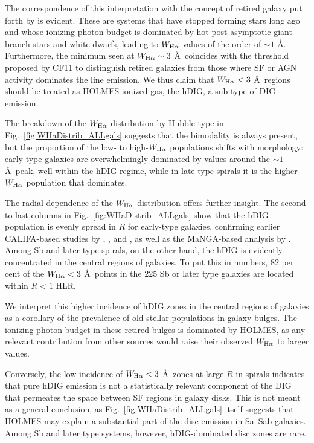 \documentclass[a4paper, fleqn, usenatbib, useAMS]{mnras}
\newcommand{\Ha}{\ifmmode {\rm H}\alpha \else H$\alpha$\fi\xspace}
\begin{document}
The correspondence of this interpretation with the concept of retired galaxy put forth by \citet{Stasinska.etal.2008a} is evident. These are systems that have stopped forming stars long ago and whose ionizing photon budget is dominated by hot post-asymptotic giant branch stars and white dwarfs, leading to $W_{\Ha}$ values of the order of $\sim 1$ \AA. Furthermore, the minimum seen at $W_{\Ha} \sim 3$ \AA\ coincides with the threshold proposed by CF11 to distinguish retired galaxies from those where SF or AGN activity dominates the line emission. We thus claim that $W_{\Ha} < 3$ \AA\ regions should be treated as HOLMES-ionized gas, the hDIG, a sub-type of DIG emission.

The breakdown of the $W_{\Ha}$ distribution by Hubble type in Fig.\ \ref{fig:WHaDistrib_ALLgals} suggests that the bimodality is always present, but the proportion of the low- to high-$W_{\Ha}$ populations shifts with morphology: early-type galaxies are overwhelmingly dominated by values around the $\sim 1$ \AA\ peak, well within the hDIG regime, while in late-type spirals it is the higher $W_{\Ha}$  population that dominates.

The radial dependence of the $W_{\Ha}$ distribution offers further insight. The second to last columns in Fig.\ \ref{fig:WHaDistrib_ALLgals} show that the hDIG population is evenly spread in $R$ for early-type galaxies, confirming earlier CALIFA-based studies by \citet{Kehrig.etal.2012}, \citet{Singh.etal.2013}, and \citet{Gomes.etal.2016b}, as well as the MaNGA-based analysis by \citet{Belfiore.etal.2016, Belfiore.etal.2017}. Among Sb and later type spirals, on the other hand, the hDIG is evidently concentrated in the central regions of galaxies. To put this in numbers, 82 per cent of the $W_{\Ha} < 3$ \AA\ points in the 225 Sb or later type galaxies are located within $R < 1$ HLR.

We interpret this higher incidence of hDIG zones in the central regions of galaxies as a corollary of the prevalence of old stellar populations in galaxy bulges. The ionizing photon budget in these retired bulges is dominated by HOLMES, as any relevant contribution from other sources would raise their observed $W_{\Ha}$ to larger values.

Conversely, the low incidence of $W_{\Ha} < 3$ \AA\ zones at large $R$ in spirals indicates that pure hDIG emission is not a statistically relevant component of the DIG that permeates the space between SF regions in galaxy disks. This is not meant as a general conclusion, as Fig.\  \ref{fig:WHaDistrib_ALLgals} itself suggests that HOLMES may explain a substantial part of the disc emission in Sa--Sab galaxies. Among Sb and later type systems, however, hDIG-dominated disc zones are rare.
\end{document}
